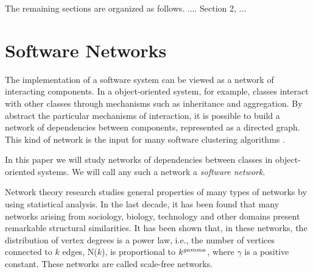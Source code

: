 The remaining sections are organized as follows. .... Section 2, ...


%

%

\section{Software Networks}

The implementation of a software system can be viewed as a network of
interacting components. In a object-oriented system, for example, classes
interact with other classes through mechanisms such as inheritance and
aggregation. By abstract the particular mechanisms of interaction, it is
possible to build a network of dependencies between components, represented as a
directed graph. This kind of network is the input for many software clustering
algorithms \cite{Mancoridis1998,Anquetil1999,Tzerpos2000,Andritsos2005}.

In this paper we will study networks of dependencies between classes in
object-oriented systems. We will call any such a network a \emph{software
network}. 


Network theory research studies general properties of many types of networks by
using statistical analysis. In the last decade, it has been found that many
networks arising from sociology, biology, technology and other domains present
remarkable structural similarities. It has been shown that, in these networks,
the distribution of vertex degrees is a power law, i.e., the number of vertices
connected to $k$ edges, N($k$), is proportional to $k^{\-gamma}$, where $\gamma$
is a positive constant. These networks are called scale-free networks.

